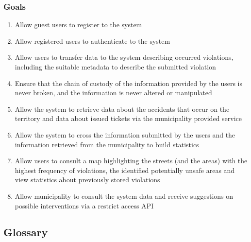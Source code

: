 \subsubsection{Goals}
	\label{sec:goals}
	\begin{enumerate}[label=\textbf{G\arabic*}]
		\item \label{goal:register} Allow guest users to register to the system
		\item \label{goal:login} Allow registered users to authenticate to the system
		\item \label{goal:userTransfer} Allow users to transfer data to the system describing occurred violations, including the suitable metadata to describe the submitted violation
		\item \label{goal:avoidLeaks} Ensure that the chain of custody of the information provided by the users is never broken, and the information is never altered or manipulated
		\item \label{goal:municipalityTransfer} Allow the system to retrieve data about the accidents that occur on the territory and data about issued tickets via the municipality provided service
		\item \label{goal:statistics} Allow the system to cross the information submitted by the users and the information retrieved from the municipality to build statistics
		\item \label{goal:consultMap} Allow users to consult a map highlighting the streets (and the areas) with the highest frequency of violations, the identified potentially unsafe areas and view statistics about previously stored violations
		\item \label{goal:retrieveData} Allow municipality to consult the system data and receive suggestions on possible interventions via a restrict access API 

	\end{enumerate}

\subsection{Glossary}
